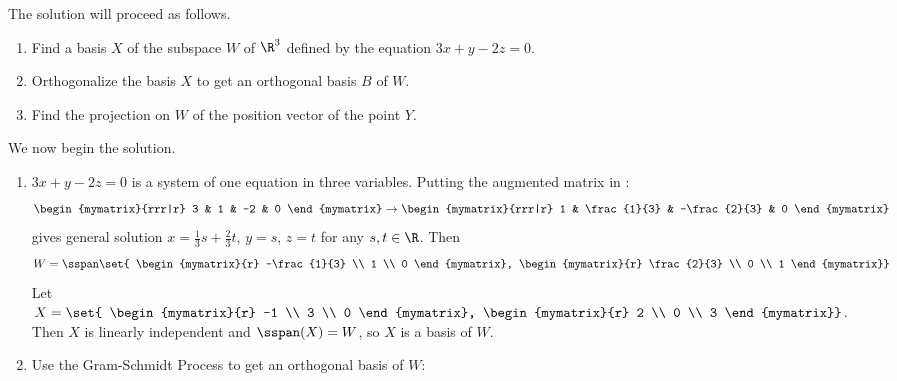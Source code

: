\begin{solution}
The solution will proceed as follows.
\begin{enumerate}
\item Find a basis $X$ of the subspace $W$ of $\R^3$ defined by
the equation  $3x+y-2z=0$.
\item Orthogonalize the basis $X$ to get an orthogonal basis
$B$ of $W$.
\item Find the projection on $W$ of the position vector of
the point $Y$.
\end{enumerate}

We now begin the solution.
\begin{enumerate}
\item $3x+y-2z=0$ is a system of one equation in three variables.
Putting the augmented matrix in {\rref}:
\[
\begin{mymatrix}{rrr|r} 3 & 1 & -2 & 0 \end{mymatrix}
\rightarrow
\begin{mymatrix}{rrr|r} 1 & \frac{1}{3} & -\frac{2}{3} & 0 \end{mymatrix}
\]
gives general solution $x=\frac{1}{3}s+\frac{2}{3}t$, $y=s$, $z=t$
for any $s,t\in\R$.
Then  
\[
W=\sspan \set{
\begin{mymatrix}{r} -\frac{1}{3} \\ 1 \\ 0 \end{mymatrix},
\begin{mymatrix}{r} \frac{2}{3} \\ 0 \\ 1 \end{mymatrix}}
\]
Let
$X=\set{
\begin{mymatrix}{r} -1 \\ 3 \\ 0 \end{mymatrix},
\begin{mymatrix}{r} 2 \\ 0 \\ 3 \end{mymatrix}}$.
Then $X$ is linearly independent and $\sspan(X)=W$, so $X$ is a basis of $W$.

\item Use the Gram-Schmidt Process to get an
orthogonal basis of $W$: 



\end{enumerate}
\end{solution}
